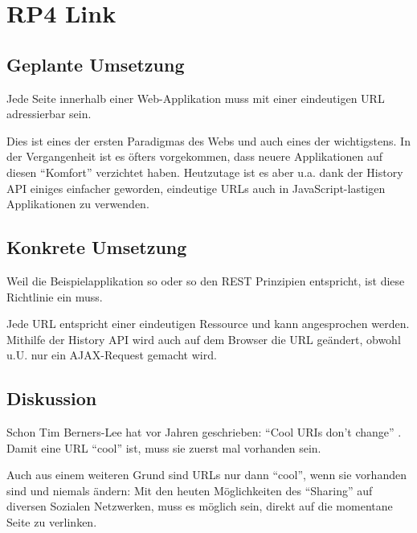 \section{RP4 Link}
\label{sec:principle-rp4-link}

\subsection*{Geplante Umsetzung}
Jede Seite innerhalb einer Web-Applikation muss mit einer eindeutigen URL adressierbar
sein.

Dies ist eines der ersten Paradigmas des Webs und auch eines der wichtigstens. In der Vergangenheit
ist es öfters vorgekommen, dass neuere Applikationen auf diesen ``Komfort'' verzichtet haben.
Heutzutage ist es aber u.a. dank der History API \cite{HistoryAPI} einiges
einfacher geworden, eindeutige URLs auch in JavaScript-lastigen Applikationen zu
verwenden.


\subsection*{Konkrete Umsetzung}
Weil die Beispielapplikation so oder so den REST \cite{REST} Prinzipien entspricht,
ist diese Richtlinie ein muss.

Jede URL entspricht einer eindeutigen Ressource und kann angesprochen werden.
Mithilfe der History API \cite{HistoryAPI} wird auch auf dem Browser die URL
geändert, obwohl u.U. nur ein AJAX-Request gemacht wird.

\subsection*{Diskussion}
Schon Tim Berners-Lee hat vor Jahren geschrieben: ``Cool URIs don't change'' \cite{CoolURIsTBL}.
Damit eine URL ``cool'' ist, muss sie zuerst mal vorhanden sein.

Auch aus einem weiteren Grund sind URLs nur dann ``cool'', wenn sie vorhanden sind
und niemals ändern: Mit den heuten Möglichkeiten des ``Sharing'' auf diversen Sozialen
Netzwerken, muss es möglich sein, direkt auf die momentane Seite zu verlinken.